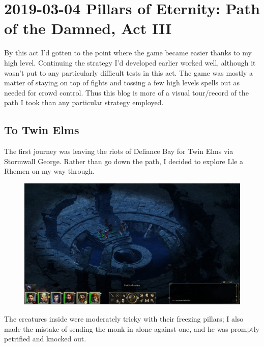 \documentclass{article}
\begin{document}
\section{2019-03-04 Pillars of Eternity: Path of the Damned, Act III}
By this act I'd gotten to the point where the game became easier thanks to my high level.  Continuing the strategy I'd developed earlier worked well, although it wasn't put to any particularly difficult tests in this act.  The game was mostly a matter of staying on top of fights and tossing a few high levels spells out as needed for crowd control.  Thus this blog is more of a visual tour/record of the path I took than any particular strategy employed.

\subsection{To Twin Elms}
The first journey was leaving the riots of Defiance Bay for Twin Elms via Stormwall George.  Rather than go down the path, I decided to explore Lle a Rhemen on my way through.

\begin{figure}
\includegraphics[scale=0.33]{files/blog/2019_03_04_pillars_of_eternity_path_of_the_damned_act_iii/2019_03_04_llearhemen_entrance.jpg}
\end{figure}

The creatures inside were moderately tricky with their freezing pillars; I also made the mistake of sending the monk in alone against one, and he was promptly petrified and knocked out.
\end{document}
